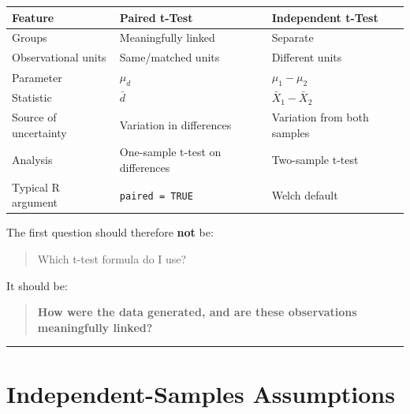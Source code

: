 \documentclass[
  letterpaper,
  DIV=11,
  numbers=noendperiod]{scrreprt}
\newcounter{none} %
\begin{document}
{\def\LTcaptype{none} %
\begin{longtable}[]{@{}
  >{\raggedright\arraybackslash}p{}
  >{\raggedright\arraybackslash}p{}
  >{\raggedright\arraybackslash}p{}@{}}
\toprule\noalign{}
\begin{minipage}[b]{\linewidth}\raggedright
Feature
\end{minipage} & \begin{minipage}[b]{\linewidth}\raggedright
Paired t-Test
\end{minipage} & \begin{minipage}[b]{\linewidth}\raggedright
Independent t-Test
\end{minipage} \\
\midrule\noalign{}
\endhead
\bottomrule\noalign{}
\endlastfoot
Groups & Meaningfully linked & Separate \\
Observational units & Same/matched units & Different units \\
Parameter & \(\mu_d\) & \(\mu_1-\mu_2\) \\
Statistic & \(\bar{d}\) & \(\bar{X}_1-\bar{X}_2\) \\
Source of uncertainty & Variation in differences & Variation from both
samples \\
Analysis & One-sample t-test on differences & Two-sample t-test \\
Typical R argument & \texttt{paired\ =\ TRUE} & Welch default \\
\end{longtable}
}

The first question should therefore \textbf{not} be:

\begin{quote}
Which t-test formula do I use?
\end{quote}

It should be:

\begin{quote}
\textbf{How were the data generated, and are these observations
meaningfully linked?}
\end{quote}

\begin{center}\rule{0.5\linewidth}{0.5pt}\end{center}


\chapter{Independent-Samples
Assumptions}\label{independent-samples-assumptions}
\end{document}
